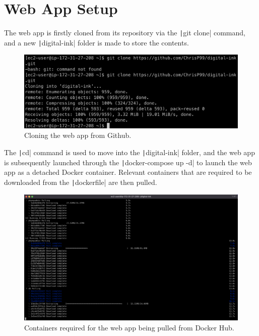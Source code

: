 \clearpage
\section{Web App Setup}\label{sec:web-app-setup2}

The web app is firstly cloned from its repository via the \texttt|git clone| command, and a new
\texttt|digital-ink| folder is made to store the contents.

\begin{figure}[!htbp]
    \centering
    \includegraphics[width=125mm]{resources/ec2/webapp-clone}
    \caption{Cloning the web app from Github.}
    \label{fig:webapp-clone}
\end{figure}

The \texttt|cd| command is used to move into the \texttt|digital-ink| folder, and the web app is
subsequently launched through the \texttt|docker-compose up -d| to launch the web app as a detached Docker
container.
Relevant containers that are required to be downloaded from the \texttt|dockerfile| are then pulled.

\begin{figure}[!htbp]
    \centering
    \includegraphics[width=125mm]{resources/ec2/docker-compose}
    \caption{Containers required for the web app being pulled from Docker Hub.}
    \label{fig:webapp-docker-compose}
\end{figure}

